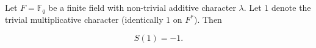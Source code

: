 Let $F = \mathbb{F}_q$ be a finite field with non-trivial additive character $\lambda$. Let $1$ denote the trivial multiplicative character (identically $1$ on $F^*$). Then

$$S(1) = -1.$$
